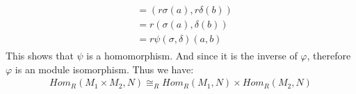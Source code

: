 \begin{enumerate}[label=]
\begin{gather*}
\begin{split}
                & = (r\sigma(a), r\delta(b)) \\
                & = r(\sigma(a), \delta(b)) \\
                & = r \psi(\sigma, \delta)(a, b)
            \end{split}
        \end{gather*}
        This shows that $\psi$ is a homomorphism. And since it is the inverse of $\varphi$, therefore $\varphi$ is an module isomorphism. Thus we have:
        \begin{gather*}
            Hom_R(M_1 \times M_2, N) \cong_R Hom_R(M_1, N) \times Hom_R(M_2, N) 
        \end{gather*}
\end{enumerate}